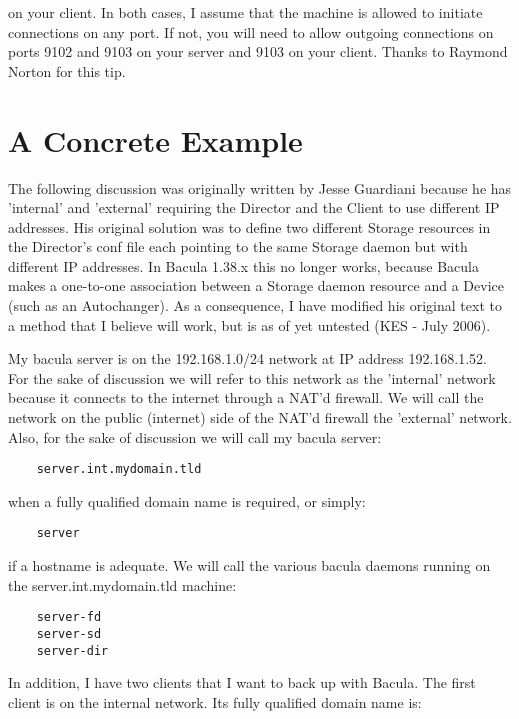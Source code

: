 on your client. In both cases, I assume that the machine is allowed to
initiate connections on any port. If not, you will need to allow outgoing
connections on ports 9102 and 9103 on your server and 9103 on your client.
Thanks to Raymond Norton for this tip.

\section{A Concrete Example}

The following discussion was originally written by
Jesse Guardiani because he has 'internal' and 'external' requiring the
Director and the Client to use different IP addresses.  His original
solution was to define two different Storage resources in the Director's
conf file each pointing to the same Storage daemon but with different
IP addresses.  In Bacula 1.38.x this no longer works, because Bacula makes
a one-to-one association between a Storage daemon resource and a Device (such
as an Autochanger).  As a consequence, I have modified his original
text to a method that I believe will work, but is as of yet untested
(KES - July 2006).

My bacula server is on the 192.168.1.0/24 network at IP address 192.168.1.52.
For the sake of discussion we will refer to this network as the 'internal'
network because it connects to the internet through a NAT'd firewall. We will
call the network on the public (internet) side of the NAT'd firewall the
'external' network. Also, for the sake of discussion we will call my bacula
server:

\footnotesize
\begin{verbatim}
    server.int.mydomain.tld
\end{verbatim}
\normalsize

when a fully qualified domain name is required, or simply:

\footnotesize
\begin{verbatim}
    server
\end{verbatim}
\normalsize

if a hostname is adequate. We will call the various bacula daemons running on
the server.int.mydomain.tld machine:

\footnotesize
\begin{verbatim}
    server-fd
    server-sd
    server-dir
\end{verbatim}
\normalsize

In addition, I have two clients that I want to back up with Bacula. The first
client is on the internal network. Its fully qualified domain name is:

